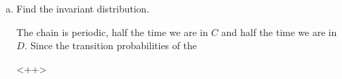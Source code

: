 \documentclass{article}
\begin{document}
\begin{enumerate}
\begin{enumerate}[(a)]
			\item Find the invariant distribution.
				\begin{soln}
					The chain is periodic, half the time we are in $C$ and half the time we are in $D.$ Since the transition probabilities of the 
				\end{soln}<++>
				
		\end{enumerate}

\end{enumerate}
\end{document}
